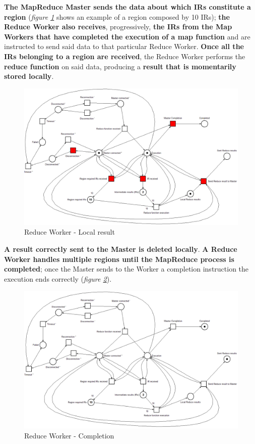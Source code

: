 \textbf{The MapReduce Master sends the data about which IRs constitute a region} (\textit{figure \ref{fig:reduce_worker_petri_net_1}} shows an example of a region composed by 10 IRs); \textbf{the Reduce Worker also receives}, progressively, \textbf{the IRs from the Map Workers that have completed the execution of a map function} and are instructed to send said data to that particular Reduce Worker. \textbf{Once all the IRs belonging to a region are received}, the Reduce Worker performs the \textbf{reduce function} on said data, producing a \textbf{result that is momentarily stored locally}.

\begin{figure}[!ht]
    \centering
    \includegraphics[scale=0.44]{document/chapters/chapter_6/images/reduce_worker_petri_net_1.png}
    \caption{Reduce Worker - Local result}
    \label{fig:reduce_worker_petri_net_1}
\end{figure}

\textbf{A result correctly sent to the Master is deleted locally}. \textbf{A Reduce Worker handles multiple regions until the MapReduce process is completed}; once the Master sends to the Worker a completion instruction the execution ends correctly (\textit{figure \ref{fig:reduce_worker_petri_net_2}}).

\begin{figure}[!ht]
    \centering
    \includegraphics[scale=0.44]{document/chapters/chapter_6/images/reduce_worker_petri_net_2.png}
    \caption{Reduce Worker - Completion}
    \label{fig:reduce_worker_petri_net_2}
\end{figure}

